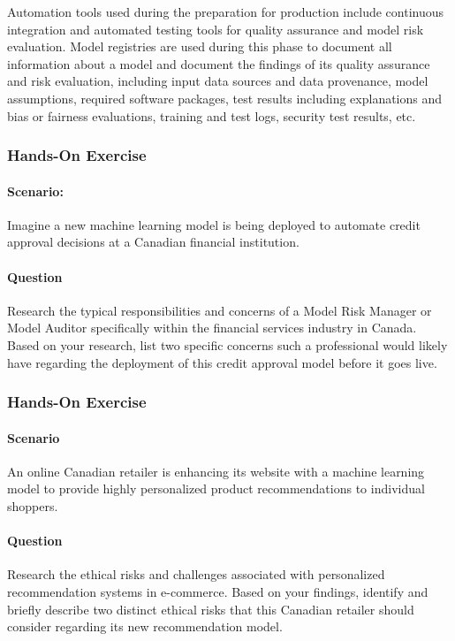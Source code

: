 Automation tools used during the preparation for production include continuous integration and automated testing tools for quality assurance and model risk evaluation. Model registries are used during this phase to document all information about a model and document the findings of its quality assurance and risk evaluation, including input data sources and data provenance, model assumptions, required software packages, test results including explanations and bias or fairness evaluations, training and test logs, security test results, etc. 

\begin{tcolorbox}[colback=code]
\subsubsection*{Hands-On Exercise} 
\paragraph*{Scenario:}
Imagine a new machine learning model is being deployed to automate credit approval decisions at a Canadian financial institution.

\paragraph*{Question}
Research the typical responsibilities and concerns of a Model Risk Manager or Model Auditor specifically within the financial services industry in Canada. Based on your research, list two specific concerns such a professional would likely have regarding the deployment of this credit approval model before it goes live.
\end{tcolorbox}

\begin{tcolorbox}[colback=code]
\subsubsection*{Hands-On Exercise} 

\paragraph*{Scenario}
An online Canadian retailer is enhancing its website with a machine learning model to provide highly personalized product recommendations to individual shoppers.

\paragraph*{Question}
Research the ethical risks and challenges associated with personalized recommendation systems in e-commerce. Based on your findings, identify and briefly describe two distinct ethical risks that this Canadian retailer should consider regarding its new recommendation model.
\end{tcolorbox}


